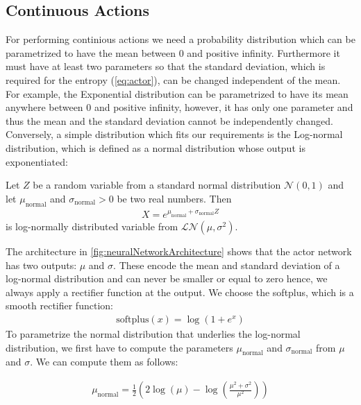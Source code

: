\documentclass[conference]{IEEEtran}
\newcommand\note[2]{{\color{#1}#2}}
\begin{document}

\subsection{Continuous Actions}

For performing continious actions we need a probability distribution which can be parametrized to have the mean between 0 and positive infinity. Furthermore it must have at least two parameters so that the standard deviation, which is required for the entropy (\autoref{eq:actor}), can be changed independent of the mean. For example, the Exponential distribution can be parametrized to have its mean anywhere between 0 and positive infinity, however, it has only one parameter and thus the mean and the standard deviation cannot be independently changed. Conversely, a simple distribution which fits our requirements is the Log-normal distribution, which is defined as a normal distribution whose output is exponentiated:

Let $Z$ be a random variable from a standard normal distribution $\mathcal{N}(0, 1)$ and let $\mu_{\text{normal}}$ and $\sigma_{\text{normal}} > 0$ be two real numbers. Then
\begin{align}
X = e^{\mu_{\text{normal}}+\sigma_{\text{normal}} Z}
\end{align}
is log-normally distributed variable from $\mathcal{LN}(\mu, \sigma^2)$.

The architecture in \autoref{fig:neuralNetworkArchitecture} shows that the actor network has two outputs: $\mu$ and $\sigma$. These encode the mean and standard deviation of a log-normal distribution and can never be smaller or equal to zero hence, we always apply a rectifier function at the output. We choose the softplus, which is a smooth rectifier function:
\begin{align}
\text{softplus}(x) = \log\left(1 + e^x \right)
\end{align}
To parametrize the normal distribution that underlies the log-normal distribution, we first have to compute the parameters $\mu_{\text{normal}}$ and $\sigma_{\text{normal}}$ from $\mu$ and $\sigma$. We can compute them as follows:

\begin{align}
\mu_{\text{normal}} = \frac{1}{2}\left( 2\log(\mu) - \log\left(\frac{\mu^2 + \sigma^2}{\mu^2}\right) \right)
\end{align}
\end{document}
